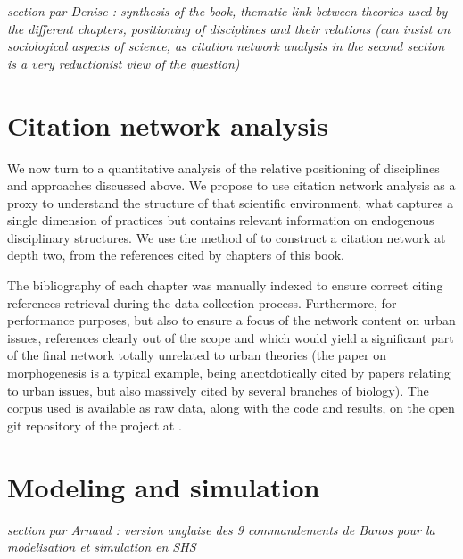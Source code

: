 \textit{section par Denise : synthesis of the book, thematic link between theories used by the different chapters, positioning of disciplines and their relations (can insist on sociological aspects of science, as citation network analysis in the second section is a very reductionist view of the question)}



\section{Citation network analysis}

We now turn to a quantitative analysis of the relative positioning of disciplines and approaches discussed above. We propose to use citation network analysis as a proxy to understand the structure of that scientific environment, what captures a single dimension of practices but contains relevant information on endogenous disciplinary structures. We use the method of \cite{} to construct a citation network at depth two, from the references cited by chapters of this book.

The bibliography of each chapter was manually indexed to ensure correct citing references retrieval during the data collection process. Furthermore, for performance purposes, but also to ensure a focus of the network content on urban issues, references clearly out of the scope and which would yield a significant part of the final network totally unrelated to urban theories (the paper on morphogenesis \cite{} is a typical example, being anectdotically cited by papers relating to urban issues, but also massively cited by several branches of biology). The corpus used is available as raw data, along with the code and results, on the open git repository of the project at \url{}.





\section{Modeling and simulation}

\textit{section par Arnaud : version anglaise des 9 commandements de Banos pour la modelisation et simulation en SHS}






